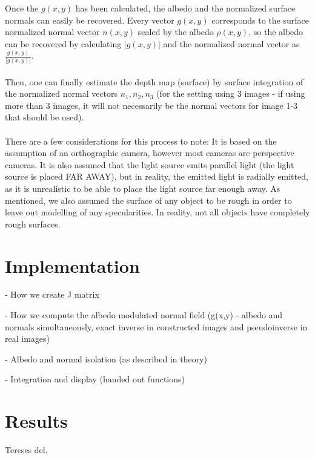 \documentclass[12pt,a4paper,oneside,final]{article}
\begin{document}
Once the $g(x,y)$ has been calculated, the albedo and the normalized surface normals can easily be recovered. Every vector $g(x,y)$ corresponds to the surface normalized normal vector $n(x,y)$ scaled by the albedo $\rho(x,y)$, so the albedo can be recovered by calculating $|g(x,y)|$ and the normalized normal vector as $\frac{g(x,y)}{|g(x,y)|}$.\\\\
Then, one can finally estimate the depth map (surface) by surface integration of the normalized normal vectors $n_1, n_2, n_3$ (for the setting using 3 images - if using more than 3 images, it will not necessarily be the normal vectors for image 1-3 that should be used).\\\\
There are a few considerations for this process to note: It is based on the assumption of an orthographic camera, however most cameras are perspective cameras. It is also assumed that the light source emits parallel light (the light source is placed FAR AWAY), but in reality, the emitted light is radially emitted, as it is unrealistic to be able to place the light source far enough away. As mentioned, we also assumed the surface of any object to be rough in order to leave out modelling of any specularities. In reality, not all objects have completely rough surfaces.

\section{Implementation}

- How we create J matrix

- How we compute the albedo modulated normal field (g(x,y) - albedo and normals simultaneously, exact inverse in constructed images and pseudoinverse in real images)

- Albedo and normal isolation (as described in theory)

- Integration and display (handed out functions)

\section{Results}

Tereses del.
\end{document}
